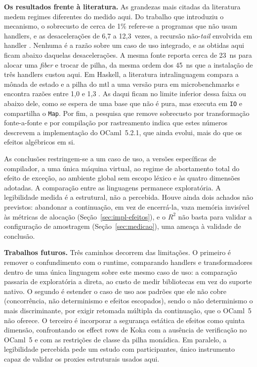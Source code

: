 \documentclass[12pt]{article}
\newcommand{\DeltaNsOcamlArith}{45}
\newcommand{\UmaMaquina}{uma única máquina virtual}
\begin{document}
\medskip
\noindent\textbf{Os resultados frente à literatura.} As grandezas mais
citadas da literatura medem regimes diferentes do medido aqui. Do trabalho que introduziu o mecanismo, o
sobrecusto de cerca de 1\% refere-se a programas que não usam
handlers, e as desacelerações de 6,7 a 12,3~vezes, a recursão
não-\textit{tail} envolvida em handler \cite{sivaramakrishnan:21}.
Nenhuma é a razão sobre um caso de uso integrado, e as obtidas aqui ficam
abaixo daquelas desacelerações. %
A mesma fonte reporta cerca de 23~ns para alocar uma \textit{fiber} e trocar
de pilha, da mesma ordem dos \DeltaNsOcamlArith{}~ns que a instalação de três
handlers custou aqui. %
Em Haskell, a
literatura intralinguagem compara a mônada de estado e a pilha do
mtl a uma versão pura em microbenchmarks e encontra razões
entre 1,0 e 1,3 \cite{kammar:13,xie:20}. As daqui ficam no limite inferior
dessa faixa ou abaixo dele, %
como se espera de uma base que não é pura, mas executa em \texttt{IO} e
compartilha o \texttt{Map}. Por fim, a pesquisa que remove sobrecusto por
transformação fonte-a-fonte e por compilação por rastreamento
\cite{karachalias:21,gaissert:25} indica que estes números descrevem a
implementação do OCaml~5.2.1, que ainda evolui, mais do que os efeitos
algébricos em si.

As conclusões restringem-se a um caso de uso, a versões específicas de
compilador, a \UmaMaquina{}, ao regime de abortamento total do efeito de exceção,
ao ambiente global sem escopo léxico e às quatro dimensões adotadas. A
comparação entre as linguagens permanece exploratória. A legibilidade medida
é a estrutural, não a percebida. Houve ainda dois achados não previstos:
abandonar a continuação, em vez de encerrá-la, vaza memória invisível às
métricas de alocação (Seção~\ref{sec:impl-efeitos}), e o $R^2$ não basta para
validar a configuração de amostragem (Seção~\ref{sec:medicao}), uma ameaça à
validade de conclusão.

\medskip
\noindent\textbf{Trabalhos futuros.} Três caminhos decorrem das limitações. O
primeiro é remover o confundimento com o runtime, comparando
handlers e transformadores dentro de uma única linguagem
\cite{xie:20} sobre este mesmo caso de uso: a comparação passaria de
exploratória a direta, ao custo de medir bibliotecas em vez do suporte nativo.
O segundo é estender o caso de uso aos padrões que ele não cobre
(concorrência, não determinismo e efeitos escopados), sendo o não
determinismo o mais discriminante, por exigir retomada múltipla da
continuação, que o OCaml~5 não oferece. O terceiro é incorporar a segurança
estática de efeitos como quinta dimensão, confrontando os effect rows
de Koka \cite{leijen:14} com a ausência de verificação no OCaml~5 e com as
restrições de classe da pilha monádica. Em paralelo, a legibilidade percebida
pede um estudo com participantes, único instrumento capaz de validar os
proxies estruturais usados aqui.
\end{document}
